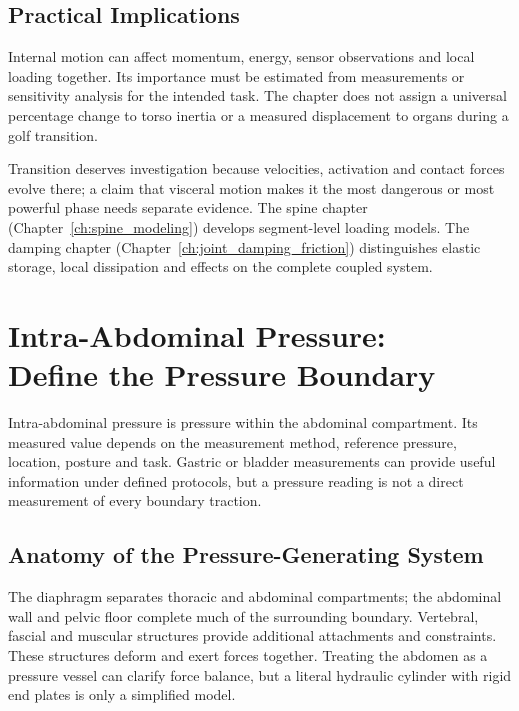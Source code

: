 \subsection{Practical Implications}

Internal motion can affect momentum, energy, sensor observations and local loading together. Its importance must be estimated from measurements or sensitivity analysis for the intended task. The chapter does not assign a universal percentage change to torso inertia or a measured displacement to organs during a golf transition.

Transition deserves investigation because velocities, activation and contact forces evolve there; a claim that visceral motion makes it the most dangerous or most powerful phase needs separate evidence. The spine chapter (Chapter~\ref{ch:spine_modeling}) develops segment-level loading models. The damping chapter (Chapter~\ref{ch:joint_damping_friction}) distinguishes elastic storage, local dissipation and effects on the complete coupled system.

\section[Intra-Abdominal Pressure: Define the Pressure Boundary]{Intra-Abdominal Pressure:\\Define the Pressure Boundary}
\label{sec:iap}

Intra-abdominal pressure is pressure within the abdominal compartment. Its measured value depends on the measurement method, reference pressure, location, posture and task. Gastric or bladder measurements can provide useful information under defined protocols, but a pressure reading is not a direct measurement of every boundary traction.

\subsection{Anatomy of the Pressure-Generating System}

The diaphragm separates thoracic and abdominal compartments; the abdominal wall and pelvic floor complete much of the surrounding boundary. Vertebral, fascial and muscular structures provide additional attachments and constraints. These structures deform and exert forces together. Treating the abdomen as a pressure vessel can clarify force balance, but a literal hydraulic cylinder with rigid end plates is only a simplified model.


